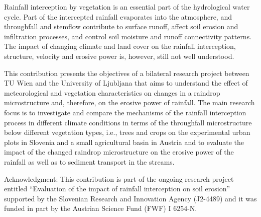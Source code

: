 \noindent

Rainfall interception by vegetation is an essential part of the hydrological water cycle. Part of the intercepted rainfall evaporates into the atmosphere, and throughfall and stemflow contribute to surface runoff, affect soil erosion and infiltration processes, and control soil moisture and runoff connectivity patterns. The impact of changing climate and land cover on the rainfall interception, structure, velocity and erosive power is, however, still not well understood. 

This contribution presents the objectives of a bilateral research project between TU Wien and the University of Ljubljana that aims to understand the effect of meteorological and vegetation characteristics on changes in a raindrop microstructure and, therefore, on the erosive power of rainfall. The main research focus is to investigate and compare the mechanisms of the rainfall interception process in different climate conditions in terms of the throughfall microstructure below different vegetation types, i.e., trees and crops on the experimental urban plots in Slovenia and a small agricultural basin in Austria and to evaluate the impact of the changed raindrop microstructure on the erosive power of the rainfall as well as to sediment transport in the streams. 

Acknowledgment: This contribution is part of the ongoing research project entitled “Evaluation of the impact of rainfall interception on soil erosion” supported by the Slovenian Research and Innovation Agency (J2-4489) and it was funded in part by the Austrian Science Fund (FWF) I 6254-N.
\newpage{}
{}
\begin{flushleft}






\end{flushleft}

